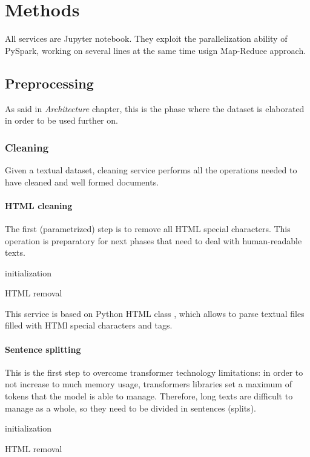\documentclass[\main/main.tex]{subfiles}
\begin{document}
\chapter{Methods}
All services are Jupyter notebook. They exploit the parallelization ability of PySpark, working on several lines at the same time usign Map-Reduce approach.
\section{Preprocessing}
As said in \textit{Architecture} chapter, this is the phase where the dataset is elaborated in order to be used further on. 
\subsection{Cleaning}
Given a textual dataset, cleaning service performs all the operations needed to have cleaned and well formed documents.
\subsubsection{HTML cleaning}
The first (parametrized) step is to remove all HTML special characters. This operation is preparatory for next phases that need to deal with human-readable texts.
\begin{center}
    \begin{algorithm}[H]
     initialization\;
     \caption{HTML removal}
    \end{algorithm}
\end{center}
This service is based on Python HTML class \cite{html_parser}, which allows to parse textual files filled with HTMl special characters and tags.
\subsubsection{Sentence splitting}
This is the first step to overcome transformer technology limitations: in order to not increase to much memory usage, transformers libraries set a maximum of tokens that the model is able to manage. Therefore, long texts are difficult to manage as a whole, so they need to be divided in sentences (splits).
\begin{center}
    \begin{algorithm}[H]
     initialization\;
     \caption{HTML removal}
    \end{algorithm}
\end{center}
\end{document}
